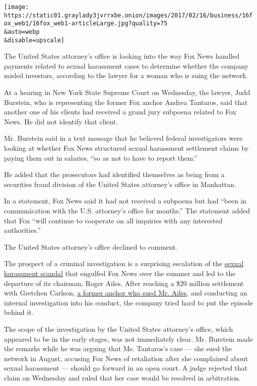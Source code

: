 \texttt{[image: https://static01.graylady3jvrrxbe.onion/images/2017/02/16/business/16fox\_web1/16fox\_web1-articleLarge.jpg?quality=75\\\&auto=webp\\\&disable=upscale]}

The United States attorney's office is looking into the way Fox News
handled payments related to sexual harassment cases to determine whether
the company misled investors, according to the lawyer for a woman who is
suing the network.

At a hearing in New York State Supreme Court on Wednesday, the lawyer,
Judd Burstein, who is representing the former Fox anchor Andrea
Tantaros, said that another one of his clients had received a grand jury
subpoena related to Fox News. He did not identify that client.

Mr. Burstein said in a text message that he believed federal
investigators were looking at whether Fox News structured sexual
harassment settlement claims by paying them out in salaries, ``so as not
to have to report them.''

He added that the prosecutors had identified themselves as being from a
securities fraud division of the United States attorney's office in
Manhattan.

In a statement, Fox News said it had not received a subpoena but had
``been in communication with the U.S. attorney's office for months.''
The statement added that Fox ``will continue to cooperate on all
inquiries with any interested authorities.''

The United States attorney's office declined to comment.

The prospect of a criminal investigation is a surprising escalation of
the
\href{https://www.nytimes3xbfgragh.onion/2016/08/23/business/media/andrea-tantaros-of-fox-news-claims-retaliation-for-harassment-complaints.html}{sexual
harassment scandal} that engulfed Fox News over the summer and led to
the departure of its chairman, Roger Ailes. After reaching a \$20
million settlement with Gretchen Carlson,
\href{https://www.nytimes3xbfgragh.onion/2016/07/07/business/media/gretchen-carlson-fox-news-roger-ailes-sexual-harassment-lawsuit.html}{a
former anchor who sued Mr. Ailes}, and conducting an internal
investigation into his conduct, the company tried hard to put the
episode behind it.

The scope of the investigation by the United States attorney's office,
which appeared to be in the early stages, was not immediately clear. Mr.
Burstein made the remarks while he was arguing that Ms. Tantaros's case
--- she sued the network in August, accusing Fox News of retaliation
after she complained about sexual harassment --- should go forward in an
open court. A judge rejected that claim on Wednesday and ruled that her
case would be resolved in arbitration.

